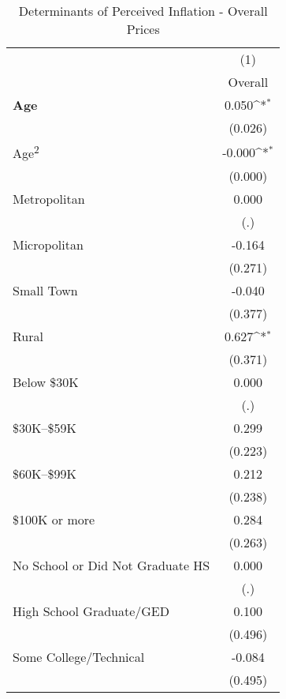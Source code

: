 \begin{table}[htbp]\centering
\def\sym#1{\ifmmode^{#1}\else\(^{#1}\)\fi}
\caption{Determinants of Perceived Inflation - Overall Prices}
\begin{tabular}{l*{1}{c}}
\toprule
                    &\multicolumn{1}{c}{(1)}\\
                    &\multicolumn{1}{c}{Overall}\\
\midrule
\textbf{Age}        &       0.050\sym{*}  \\
                    &     (0.026)         \\
Age\textsuperscript{2}&      -0.000\sym{*}  \\
                    &     (0.000)         \\
Metropolitan        &       0.000         \\
                    &         (.)         \\
Micropolitan        &      -0.164         \\
                    &     (0.271)         \\
Small Town          &      -0.040         \\
                    &     (0.377)         \\
Rural               &       0.627\sym{*}  \\
                    &     (0.371)         \\
Below \$30K         &       0.000         \\
                    &         (.)         \\
\$30K--\$59K        &       0.299         \\
                    &     (0.223)         \\
\$60K--\$99K        &       0.212         \\
                    &     (0.238)         \\
\$100K or more      &       0.284         \\
                    &     (0.263)         \\
No School or Did Not Graduate HS&       0.000         \\
                    &         (.)         \\
High School Graduate/GED&       0.100         \\
                    &     (0.496)         \\
Some College/Technical&      -0.084         \\
                    &     (0.495)         \\

\end{tabular}
\end{table}
